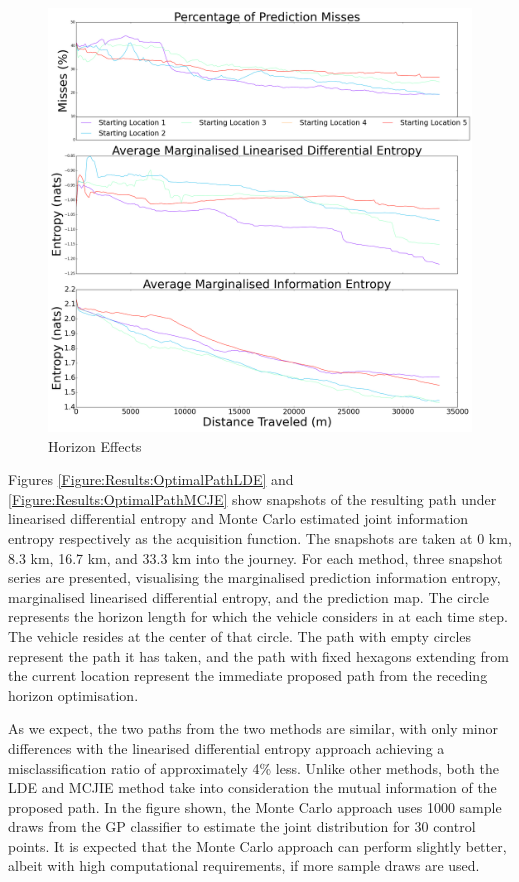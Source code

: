 \documentclass{article}
\begin{document}
		\begin{figure}[!htbp]
		\centering
			\includegraphics[width = \linewidth]{Figures/compare_locations.png}
		\caption{Horizon Effects}
		\label{Figure:Results:CompareLocations}
		\end{figure}
		
		Figures \ref{Figure:Results:OptimalPathLDE} and \ref{Figure:Results:OptimalPathMCJE} show snapshots of the resulting path under linearised differential entropy and Monte Carlo estimated joint information entropy respectively as the acquisition function. The snapshots are taken at 0 km, 8.3 km, 16.7 km, and 33.3 km into the journey. For each method, three snapshot series are presented, visualising the marginalised prediction information entropy, marginalised linearised differential entropy, and the prediction map. The circle represents the horizon length for which the vehicle considers in at each time step. The vehicle resides at the center of that circle. The path with empty circles represent the path it has taken, and the path with fixed hexagons extending from the current location represent the immediate proposed path from the receding horizon optimisation.
		
		As we expect, the two paths from the two methods are similar, with only minor differences with the linearised differential entropy approach achieving a misclassification ratio of approximately 4\% less. Unlike other methods, both the LDE and MCJIE method take into consideration the mutual information of the proposed path. In the figure shown, the Monte Carlo approach uses 1000 sample draws from the GP classifier to estimate the joint distribution for 30 control points. It is expected that the Monte Carlo approach can perform slightly better, albeit with high computational requirements, if more sample draws are used.
		
\end{document}
